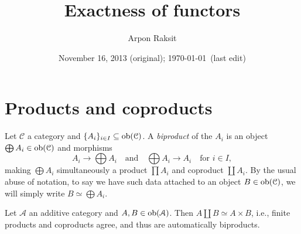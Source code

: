 


\title{Exactness of functors}
\author{Arpon Raksit}
\date{November 16, 2013 (original); \today\ (last edit)}


\maketitle
\thispagestyle{fancy}


\renewcommand{\A}{\mathcal{A}}
\renewcommand{\B}{\mathcal{B}}
\renewcommand{\C}{\mathcal{C}}


\section{Products and coproducts}

\begin{definition}
  \label{biproduct}
  Let $\C$ a category and $\{A_i\}_{i \in I} \subseteq \ob(\C)$. A
  \textit{biproduct} of the $A_i$ is an object $\bigoplus A_i \in
  \ob(\C)$ and morphisms
  \[
  \textstyle{A_i \to \bigoplus A_i \quad\text{and}\quad \bigoplus A_i
    \to A_i \quad \text{for }i \in I,}
  \]
  making $\bigoplus A_i$ simultaneously a product $\prod A_i$ and
  coproduct $\coprod A_i$. By the usual abuse of notation, to say we
  have such data attached to an object $B \in \ob(\C)$, we will simply
  write $B \simeq \bigoplus A_i$.
\end{definition}

\begin{lemma}
  \label{coproduct-biproduct}
  Let $\A$ an additive category and $A,B \in \ob(\A)$. Then $A \amalg
  B \simeq A \times B$, i.e., finite products and coproducts agree,
  and thus are automatically biproducts.
\end{lemma}

